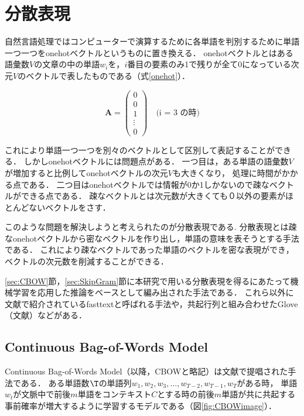 \documentclass[a4j,11pt,report]{jsbook}
\begin{document}
\chapter{分散表現\label{ch:Distributed representation}}
自然言語処理ではコンピューターで演算するために各単語を判別するために単語一つ一つをonehotベクトルというものに置き換える．
onehotベクトルとはある語彙数$V$の文章の中の単語$w_{i}$を，$i$番目の要素のみ1で残りが全て0になっている次元$V$のベクトルで表したものである（式\ref{onehot}）．

\begin{equation}
  \label{onehot}
  \bm{A} = \left(
  \begin{array}{c}
    0 \\
    0 \\
    1 \\
    \vdots \\
    0
  \end{array}
  \right)
  \quad \text{(i = 3 の時)}
\end{equation}


これにより単語一つ一つを別々のベクトルとして区別して表記することができる．
しかしonehotベクトルには問題点がある．
一つ目は，ある単語の語彙数$V$が増加すると比例してonehotベクトルの次元$V$も大きくなり，
処理に時間がかかる点である．
二つ目はonehotベクトルでは情報が0か1しかないので疎なベクトルができる点である．
疎なベクトルとは次元数が大きくても０以外の要素がほとんどないベクトルをさす．

このような問題を解決しようと考えられたのが分散表現である.
分散表現とは疎なonehotベクトルから密なベクトルを作り出し，単語の意味を表そうとする手法である．
これにより疎なベクトルであった単語のベクトルを密な表現ができ，ベクトルの次元数を削減することができる．

\ref{sec:CBOW}節，\ref{sec:SkipGram}節に本研究で用いる分散表現を得るにあたって機械学習を応用した推論をベースとして編み出された手法である．
これら以外に文献\cite{1607.01759}で紹介されているfasttextと呼ばれる手法や，共起行列と組み合わせたGlove（文献\cite{glove}）などがある．


\section{Continuous Bag-of-Words Model\label{sec:CBOW}}
Continuous Bag-of-Words Model（以降，CBOWと略記）は文献\cite{SkipCBOW}で提唱された手法である．
ある単語数$\T$の単語列$w_{1},w_{2},w_{3},\dots,w_{T-2},w_{T-1},w_{T}$がある時，
単語$w_{t}$が文脈中で前後$m$単語をコンテキスト$C$とする時の前後$m$単語が共に共起する事前確率が増大するように学習するモデルである（図\ref{fig:CBOWimage}）．
\end{document}
